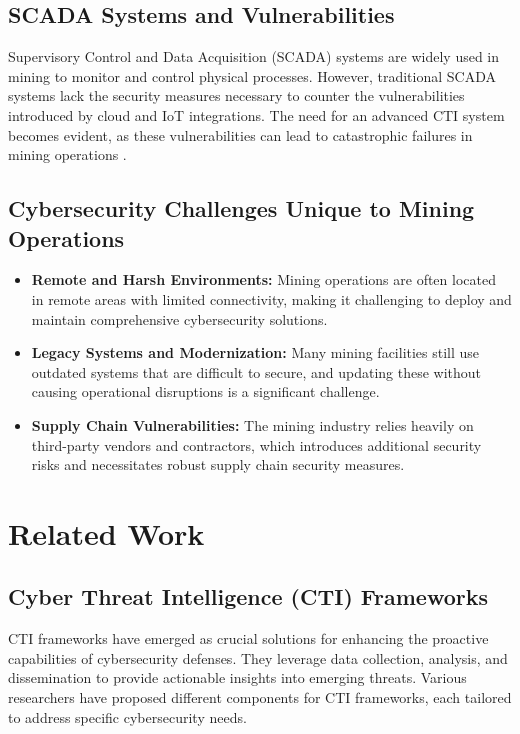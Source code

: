 \documentclass[a4paper,twoside,12pt]{report}
\begin{document}
\subsection{SCADA Systems and Vulnerabilities}
Supervisory Control and Data Acquisition (SCADA) systems are widely used in mining to monitor and control physical processes. However, traditional SCADA systems lack the security measures necessary to counter the vulnerabilities introduced by cloud and IoT integrations. The need for an advanced CTI system becomes evident, as these vulnerabilities can lead to catastrophic failures in mining operations \citep{wang2013cyber}.

\subsection{Cybersecurity Challenges Unique to Mining Operations}
\begin{itemize}
    \item \textbf{Remote and Harsh Environments:} Mining operations are often located in remote areas with limited connectivity, making it challenging to deploy and maintain comprehensive cybersecurity solutions.
    \item \textbf{Legacy Systems and Modernization:} Many mining facilities still use outdated systems that are difficult to secure, and updating these without causing operational disruptions is a significant challenge.
    \item \textbf{Supply Chain Vulnerabilities:} The mining industry relies heavily on third-party vendors and contractors, which introduces additional security risks and necessitates robust supply chain security measures.
\end{itemize}

\section{Related Work}
\subsection{Cyber Threat Intelligence (CTI) Frameworks}
CTI frameworks have emerged as crucial solutions for enhancing the proactive capabilities of cybersecurity defenses. They leverage data collection, analysis, and dissemination to provide actionable insights into emerging threats. Various researchers have proposed different components for CTI frameworks, each tailored to address specific cybersecurity needs.
\end{document}
